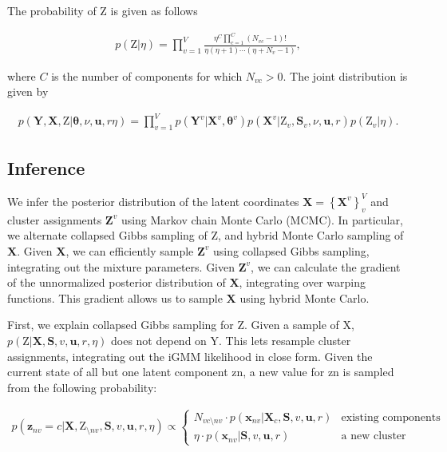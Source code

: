 \documentclass[]{article}
\newcommand{\Z}{\boldsymbol{\mathrm{Z}}}
\newcommand{\Scluster}{\mathbf{S}}
\newcommand{\setYv}{\mathbf{Y}^{v}}
\newcommand{\setY}{\mathbf{Y}}
\newcommand{\setXv}{\mathbf{X}^{v}}
\newcommand{\setZv}{\mathbf{Z}^{v}}
\newcommand{\setX}{\mathbf{X}}
\newcommand{\hParams}{\boldsymbol{\theta}}
\newcommand{\hParamsv}{\boldsymbol{\theta}^{v}}
\newcommand{\obspv}{\mathbf{x}_{nv}}
\begin{document}
The probability of $\Z$ is given as follows 

\begin{align}
p\left(\Z|\eta\right) = \prod_{v=1}^{V}\frac{\eta^C \prod_{c=1}^{C}\left(N_{vc}-1\right)!}{\eta\left(\eta+1\right)\cdots\left(\eta+ N_v -1\right)},
\end{align}

where $C$ is the number of components for which $N_{vc} >
0$. The joint distribution is given by

\begin{align}
p\left(\setY,\setX,\Z|\hParams,\nu,\mathbf{u},r\eta\right) = \prod_{v=1}^{V}p\left(\setYv|\setXv,\hParamsv\right)p\left(\setXv|\Z_v,\Scluster_v , \nu,\mathbf{u},r\right)p\left(\Z_v|\eta\right).
\end{align}


\subsection{Inference}

We infer the posterior distribution of the latent coordinates
$\setX = \left\{\setXv\right\}_v^{V}$ and cluster assignments $\setZv$ using Markov
chain Monte Carlo (MCMC). In particular, we alternate
collapsed Gibbs sampling of $\Z$, and hybrid Monte
Carlo sampling of $\setX$. Given $\setX$, we can efficiently sample
$\setZv$ using collapsed Gibbs sampling, integrating out
the mixture parameters. Given $\setZv$, we can calculate the
gradient of the unnormalized posterior distribution of
$\setX$, integrating over warping functions. This gradient
allows us to sample $\setX$ using hybrid Monte Carlo.

First, we explain collapsed Gibbs sampling for Z.
Given a sample of X, $p\left(\Z|\setX,\Scluster,v,\mathbf{u},r,\eta\right)$ does not depend
on Y. This lets resample cluster assignments,
integrating out the iGMM likelihood in close form.
Given the current state of all but one latent component
zn, a new value for zn is sampled from the following
probability:

\begin{align*}
p\left(\mathbf{z}_{nv} = c| \setX,\Z_{\setminus nv},\Scluster,v,\mathbf{u},r,\eta\right) \propto \left\{\begin{array}{cc}
N_{vc\setminus{nv}}\cdot p\left(\obspv|\setX_c, \Scluster,v,\mathbf{u},r\right) & \textrm{existing components}\\
\eta\cdot p\left(\obspv|\Scluster,v,\mathbf{u},r\right) & \textrm{a new cluster}
\end{array}\right.
\end{align*} 
\end{document}
